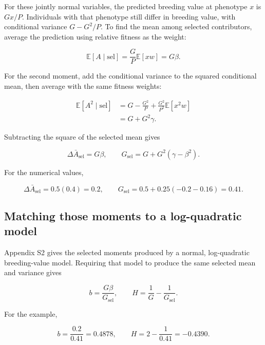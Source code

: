 \documentclass[11pt]{article}
\newcommand{\E}{\mathbb{E}}
\begin{document}
For these jointly normal variables, the predicted breeding value at phenotype $x$ is $Gx/P$. Individuals with that phenotype still differ in breeding value, with conditional variance $G-G^2/P$. To find the mean among selected contributors, average the prediction using relative fitness as the weight:

\begin{equation}
\E[A\mid\mathrm{sel}]
=\frac{G}{P}\E[xw]=G\beta.
\end{equation}

For the second moment, add the conditional variance to the squared
conditional mean, then average with the same fitness weights:

\begin{align}
\E[A^2\mid\mathrm{sel}]
&=G-\frac{G^2}{P}
+\frac{G^2}{P^2}\E[x^2w]\nonumber\\
&=G+G^2\gamma.
\end{align}

Subtracting the square of the selected mean gives

\begin{equation}
\Delta\bar A_{\mathrm{sel}}=G\beta,
\qquad
G_{\mathrm{sel}}=G+G^2(\gamma-\beta^2).
\label{eq:guide-BV-moments}
\end{equation}

For the numerical values,

\begin{equation}
\Delta\bar A_{\mathrm{sel}}=0.5(0.4)=0.2,
\qquad
G_{\mathrm{sel}}=0.5+0.25(-0.2-0.16)=0.41.
\end{equation}

\subsection{Matching those moments to a log-quadratic model}

Appendix S2 gives the selected moments produced by a normal,
log-quadratic breeding-value model.  Requiring that model to produce the same
selected mean and variance gives

\begin{equation}
b=\frac{G\beta}{G_{\mathrm{sel}}},
\qquad
H=\frac{1}{G}-\frac{1}{G_{\mathrm{sel}}}.
\label{eq:guide-conversion-one}
\end{equation}

For the example,

\begin{equation}
b=\frac{0.2}{0.41}=0.4878,
\qquad
H=2-\frac{1}{0.41}=-0.4390.
\end{equation}
\end{document}
